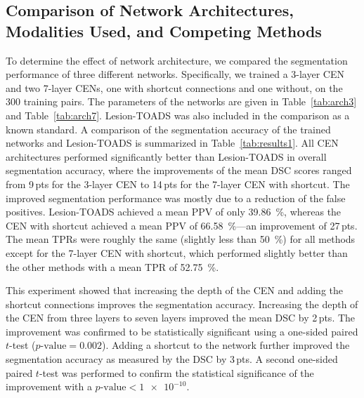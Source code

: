 \subsection{Comparison of Network Architectures, Modalities Used, and
Competing Methods}


To determine the effect of network architecture, we compared the segmentation
performance of three different networks.
Specifically, we trained a 3-layer CEN and two 7-layer CENs, one with shortcut
connections and one without, on the 300 training pairs. The parameters of the
networks are given in Table~\ref{tab:arch3} and Table~\ref{tab:arch7}.
Lesion-TOADS was also included in the comparison as a known standard.
A comparison of the segmentation accuracy of the trained networks and
Lesion-TOADS is summarized in Table~\ref{tab:results1}. All CEN architectures
performed significantly better than Lesion-TOADS in overall segmentation
accuracy, where the improvements of the mean DSC scores ranged from 9\,pts for
the 3-layer CEN to 14\,pts for the 7-layer CEN with shortcut. The
improved segmentation performance was mostly due to a reduction of the false
positives. Lesion-TOADS achieved a mean PPV of only \SI{39.86}{\percent},
whereas the CEN with shortcut achieved a mean PPV of \SI{66.58}{\percent}---an
improvement of 27\,pts. The mean TPRs were roughly the same (slightly less than
\SI{50}{\percent}) for all methods except for the 7-layer CEN with shortcut,
which performed slightly better than the other methods with a mean TPR of
\SI{52.75}{\percent}.

This experiment showed that increasing the depth of the CEN
and adding the shortcut connections improves the segmentation accuracy.
Increasing the depth of the CEN from three layers to seven layers improved the
mean DSC by 2\,pts. The improvement was confirmed to be statistically
significant using a one-sided paired $t$-test ($p\text{-value}=\num{0.002}$).
Adding a shortcut to the network further improved the segmentation
accuracy as measured by the DSC by 3\,pts. A second one-sided paired $t$-test
was performed to confirm the statistical significance of the improvement with a
$p\text{-value} < \num{1e-10}$.

